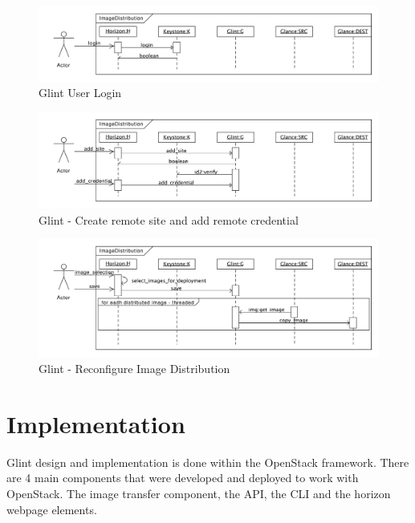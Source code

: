 \documentclass[a4paper]{jpconf}
\begin{document}
\begin{figure}[h]
\begin{center}
\includegraphics[width=36pc]{images/glintlogin.pdf}
\caption{\label{fig:glintlogin}Glint User Login}
\end{center}
\end{figure}

\begin{figure}[h]
\begin{center}
\includegraphics[width=36pc]{images/glintsitecred.pdf}
\caption{\label{fig:glintsitecred}Glint - Create remote site and add remote credential}
\end{center}
\end{figure}

\begin{figure}[h]
\begin{center}
\includegraphics[width=36pc]{images/glintdist.pdf}
\caption{\label{fig:glintdist}Glint - Reconfigure Image Distribution}
\end{center}
\end{figure}

\section{Implementation}

Glint design and implementation is done within the OpenStack framework. There are 4 main components that were developed and deployed to work with OpenStack. The image transfer component, the API, the CLI and the horizon webpage elements. 
\end{document}

